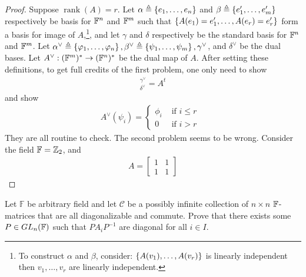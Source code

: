 \documentclass{report}
\begin{document}
\begin{proof}
  Suppose $\operatorname{rank}(A)=r$. Let $\alpha \triangleq \left\{ e_1,\dots ,e_n \right\}$ and $\beta  \triangleq \left\{ e_1',\dots ,e_m' \right\}$ respectively be basis for $\mathbb{F}^n$ and  $\mathbb{F}^m$ such that  $\left\{ A(e_1)=e_1',\dots ,A(e_r)=e_r' \right\}$ form a basis for image of $A$,\footnote{ To construct $\alpha$ and $\beta $, consider: $\left\{ A(v_1),\dots ,A(v_r) \right\}$ is linearly independent then $v_1,\dots ,v_r$ are linearly independent.}, and let $\gamma$ and $\delta$ respectively be the standard basis for $\mathbb{F}^n$ and  $\mathbb{F}^m$.  Let $\alpha ^{\vee}\triangleq \set{\pfi_1,\dots ,\pfi_n},\beta ^{\vee}\triangleq \set{\psi_1,\dots ,\psi_m},\gamma ^{\vee}$, and $\delta^{\vee}$ be the dual bases. Let $A^{\vee}:(\mathbb{F}^m)^* \rightarrow (\mathbb{F}^n)^*$ be the dual map of $A$.  After setting these definitions, to get full credits of the first problem, one only need to show 
\begin{align*}
  [A^{\vee}]_{\delta  ^{\vee}}^{\gamma ^{\vee}}= A^t
\end{align*}
and show
\begin{align}
\label{Avf}
  A^{\vee}(\psi_i)=\begin{cases}
    \phi_i & \text{ if }i\leq r\\
    0& \text{ if $i>r$ }
  \end{cases}
\end{align}
They are all routine to check. The second problem seems to be wrong. Consider the field $\mathbb{F}=\mathbb{Z}_2$, and 
\begin{align*}
A=\begin{bmatrix}
  1 & 1 \\
  1 & 1 
\end{bmatrix}
\end{align*}
\end{proof}
\begin{question}{}{}
Let $\mathbb{F}$ be arbitrary field and let $\mathcal{C}$ be a possibly infinite collection of $n\times n$ $\mathbb{F}$-matrices that are all diagonalizable and commute. Prove that there exists some $P \in GL_n(\mathbb{F})$ such that  $PA_iP^{-1}$ are diagonal for all $i \in I$.   
\end{question}
\end{document}
